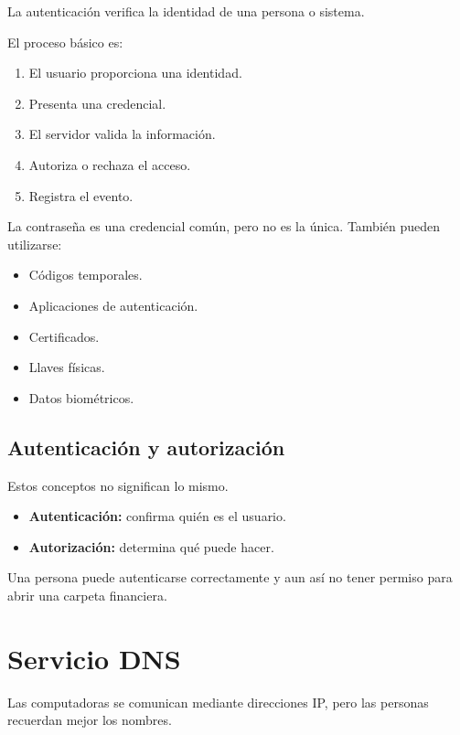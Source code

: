 \documentclass[
  spanish,
  letterpaper,
]{scrbook}
\providecommand{\tightlist}{%
  \setlength{\itemsep}{0pt}\setlength{\parskip}{0pt}}
\begin{document}
La autenticación verifica la identidad de una persona o sistema.

El proceso básico es:

\begin{enumerate}
\def\labelenumi{\arabic{enumi}.}
\tightlist
\item
  El usuario proporciona una identidad.
\item
  Presenta una credencial.
\item
  El servidor valida la información.
\item
  Autoriza o rechaza el acceso.
\item
  Registra el evento.
\end{enumerate}

La contraseña es una credencial común, pero no es la única. También
pueden utilizarse:

\begin{itemize}
\tightlist
\item
  Códigos temporales.
\item
  Aplicaciones de autenticación.
\item
  Certificados.
\item
  Llaves físicas.
\item
  Datos biométricos.
\end{itemize}

\section{Autenticación y
autorización}\label{autenticaciuxf3n-y-autorizaciuxf3n}

Estos conceptos no significan lo mismo.

\begin{itemize}
\tightlist
\item
  \textbf{Autenticación:} confirma quién es el usuario.
\item
  \textbf{Autorización:} determina qué puede hacer.
\end{itemize}

Una persona puede autenticarse correctamente y aun así no tener permiso
para abrir una carpeta financiera.


\chapter{Servicio DNS}\label{servicio-dns}

Las computadoras se comunican mediante direcciones IP, pero las personas
recuerdan mejor los nombres.
\end{document}
